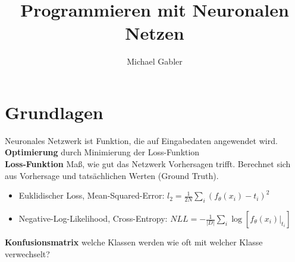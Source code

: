 \documentclass[12pt]{article}
\begin{document}
	\title{Programmieren mit Neuronalen Netzen}
	\author{Michael Gabler}
	\maketitle
	\tableofcontents
	\newpage

	\section{Grundlagen}
	Neuronales Netzwerk ist Funktion, die auf Eingabedaten angewendet wird.\\
	\textbf{Optimierung} durch Minimierung der Loss-Funktion\\
	\textbf{Loss-Funktion} Maß, wie gut das Netzwerk Vorhersagen trifft. Berechnet sich aus Vorhersage und tatsächlichen Werten (Ground Truth).
	\begin{itemize}
		\item Euklidischer Loss, Mean-Squared-Error: $l_2 = \frac{1}{2N} \sum_i (f_\theta(x_i)-t_i)^2$
		\item Negative-Log-Likelihood, Cross-Entropy: $NLL = -\frac{1}{|D|}\sum_i \log[f_\theta(x_i)|_{t_i}]$
		
	\end{itemize}
	\textbf{Konfusionsmatrix} welche Klassen werden wie oft mit welcher Klasse verwechselt?
	
\end{document}

